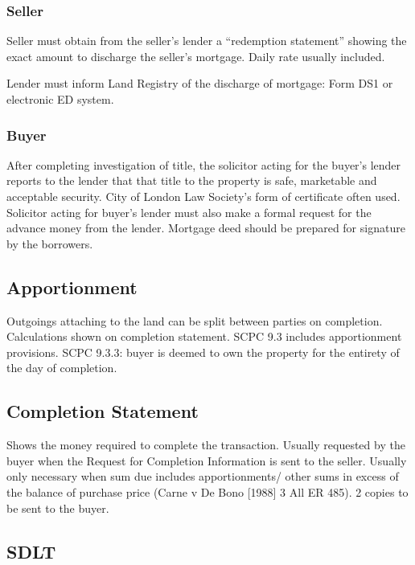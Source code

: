 \documentclass[
]{article}
\begin{document}
\hypertarget{seller}{%
\subsubsection{Seller}\label{seller}}

Seller must obtain from the seller's lender a ``redemption statement''
showing the exact amount to discharge the seller's mortgage. Daily rate
usually included.

Lender must inform Land Registry of the discharge of mortgage: Form DS1
or electronic ED system.

\hypertarget{buyer}{%
\subsubsection{Buyer}\label{buyer}}

After completing investigation of title, the solicitor acting for the
buyer's lender reports to the lender that that title to the property is
safe, marketable and acceptable security. City of London Law Society's
form of certificate often used. Solicitor acting for buyer's lender must
also make a formal request for the advance money from the lender.
Mortgage deed should be prepared for signature by the borrowers.

\hypertarget{apportionment}{%
\subsection{Apportionment}\label{apportionment}}

Outgoings attaching to the land can be split between parties on
completion. Calculations shown on completion statement. SCPC 9.3
includes apportionment provisions. SCPC 9.3.3: buyer is deemed to own
the property for the entirety of the day of completion.

\hypertarget{completion-statement}{%
\subsection{Completion Statement}\label{completion-statement}}

Shows the money required to complete the transaction. Usually requested
by the buyer when the Request for Completion Information is sent to the
seller. Usually only necessary when sum due includes apportionments/
other sums in excess of the balance of purchase price (Carne v De Bono
{[}1988{]} 3 All ER 485). 2 copies to be sent to the buyer.

\hypertarget{sdlt}{%
\subsection{SDLT}\label{sdlt}}
\end{document}
